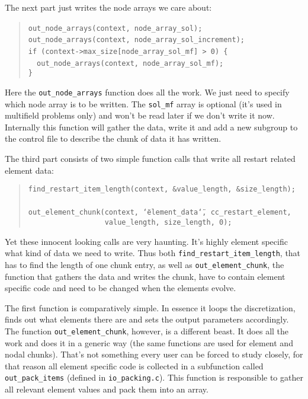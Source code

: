 The next part just writes the node arrays we care about: 

\begin{quote}
\texttt{out{\_}node{\_}arrays(context,~node{\_}array{\_}sol);~}~\\
 \texttt{out{\_}node{\_}arrays(context,~node{\_}array{\_}sol{\_}increment);~}~\\
 \texttt{if~(context->max{\_}size{[}node{\_}array{\_}sol{\_}mf]~>~0)~{\{}~}~\\
 \texttt{~~out{\_}node{\_}arrays(context,~node{\_}array{\_}sol{\_}mf);~}~\\
 \texttt{{\}} }
\end{quote}
Here the \texttt{out{\_}node{\_}arrays} function does all the
work. We just need to specify which node array is to be written. The
\texttt{sol{\_}mf} array is optional (it's used in multifield problems
only) and won't be read later if we don't write it now. Internally
this function will gather the data, write it and add a new subgroup
to the control file to describe the chunk of data it has written.

The third part consists of two simple function calls that write all
restart related element data: 

\begin{quote}
\texttt{find{\_}restart{\_}item{\_}length(context,~{\&}value{\_}length,~{\&}size{\_}length);~}~\\
 \texttt{out{\_}element{\_}chunk(context,~\char`\"{}element{\_}data\char`\"{},~cc{\_}restart{\_}element,~}~\\
 \texttt{~~~~~~~~~~~~~~~~~~value{\_}length,~size{\_}length,~0); }
\end{quote}
Yet these innocent looking calls are very haunting. It's highly element
specific what kind of data we need to write. Thus both \texttt{find{\_}restart{\_}item{\_}length},
that has to find the length of one chunk entry, as well as \texttt{out{\_}element{\_}chunk},
the function that gathers the data and writes the chunk, have to contain
element specific code and need to be changed when the elements evolve.

The first function is comparatively simple. In essence it loops the
discretization, finds out what elements there are and sets the output
parameters accordingly. The function \texttt{out{\_}element{\_}chunk},
however, is a different beast. It does all the work and does it in
a generic way (the same functions are used for element and nodal chunks).
That's not something every user can be forced to study closely, for
that reason all element specific code is collected in a subfunction
called \texttt{out{\_}pack{\_}items} (defined in \texttt{io{\_}packing.c}).
This function is responsible to gather all relevant element values
and pack them into an array.

